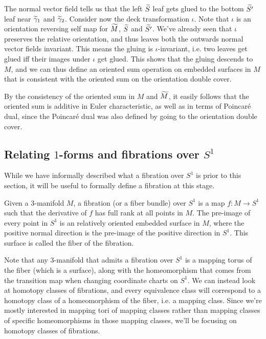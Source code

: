 The normal vector field tells us that the left $\widetilde{S}$ leaf gets glued to the bottom $\widetilde{S'}$
leaf near $\widetilde{\gamma}_1$ and $\widetilde{\gamma}_2$. Consider now the deck transformation $\iota$. Note
that $\iota$ is an orientation reversing self map for $\widetilde{M}$, $\widetilde{S}$ and $\widetilde{S'}$. We've
already seen that $\iota$ preserves the relative orientation, and thus leaves both the outwards
normal vector fields invariant. This means the gluing is $\iota$-invariant, i.e.  two leaves get
glued iff their images under $\iota$ get glued. This shows that the gluing descends to $M$, and we
can thus define an oriented sum operation on embedded surfaces in $M$ that is consistent with the
oriented sum on the orientation double cover.

By the consistency of the oriented sum in $M$ and $\widetilde{M}$, it easily follows that the oriented sum
is additive in Euler characteristic, as well as in terms of Poincar\'e dual, since the Poincar\'e
dual was also defined by going to the orientation double cover.

\subsection{Relating $1$-forms and fibrations over $S^1$}
\label{sec:relating-1-forms}
While we have informally described what a fibration over $S^1$ is prior to this section, it will be
useful to formally define a fibration at this stage.
\begin{defn}
  Given a $3$-manifold $M$, a fibration (or a fiber bundle) over $S^1$ is a map $f: M \to S^1$ such
  that the derivative of $f$ has full rank at all points in $M$. The pre-image of every point in
  $S^1$ is an relatively oriented embedded surface in $M$, where the positive normal direction is
  the pre-image of the positive direction in $S^1$. This surface is called the fiber of the
  fibration.
\end{defn}
Note that any $3$-manifold that admits a fibration over $S^1$ is a mapping torus of the fiber
(which is a surface), along with the homeomorphism that comes from the transition map when changing
coordinate charts on $S^1$. We can instead look at homotopy classes of fibrations, and every
equivalence class will correspond to a homotopy class of a homeomorphism of the fiber, i.e. a
mapping class. Since we're mostly interested in mapping tori of mapping classes rather than mapping
classes of specific homeomorphisms in those mapping classes, we'll be focusing on homotopy classes
of fibrations.

